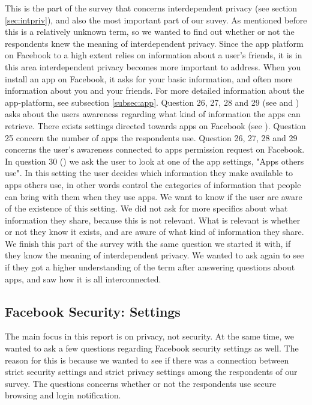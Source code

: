 This is the part of the survey that concerns interdependent privacy (see section \ref{sec:intpriv}), and also the most important part of our suvey. As mentioned before this is a relatively unknown term, so we wanted to find out whether or not the respondents knew the meaning of interdependent privacy. Since the app platform on Facebook to a high extent relies on information about a user's friends, it is in this area interdependent privacy becomes more important to address. When you install an app on Facebook, it asks for your basic information, and often more information about you and your friends. For more detailed information about the app-platform, see subsection \ref{subsec:app}. Question 26, 27, 28 and 29 (see  and ) asks about the users awareness regarding what kind of information the apps can retrieve. There exists settings directed towards apps on Facebook (see ). Question 25 concern the number of apps the respondents use. Question 26, 27, 28 and 29 concerns the user's awareness connected to apps permission request on Facebook. In question 30 () we ask the user to look at one of the app settings, "Apps others use". In this setting the user decides which information they make available to apps others use, in other words control the categories of information that people can bring with them when they use apps. We want to know if the user are aware of the existence of this setting. We did not ask for more specifics about what information they share, because this is not relevant. What is relevant is whether or not they know it exists, and are aware of what kind of information they share. We finish this part of the survey with the same question we started it with, if they know the meaning of interdependent privacy. We wanted to ask again to see if they got a higher understanding of the term after answering questions about apps, and saw how it is all interconnected. 


\subsection{Facebook Security: Settings}
The main focus in this report is on privacy, not security. At the same time, we wanted to ask a few questions regarding Facebook security settings as well. The reason for this is because we wanted to see if there was a connection between strict security settings and strict privacy settings among the respondents of our survey. The questions concerns whether or not the respondents use secure browsing and login notification.

